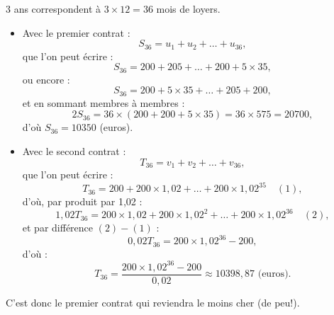 3 ans correspondent à \( 3 \times 12 = 36 \) mois de loyers.

\begin{itemize}
    \item Avec le premier contrat :
    \[
    S_{36} = u_1 + u_2 + \dots + u_{36},
    \]
    que l'on peut écrire :
    \[
    S_{36} = 200 + 205 + \dots + 200 + 5 \times 35,
    \]
    ou encore :
    \[
    S_{36} = 200 + 5 \times 35 + \dots + 205 + 200,
    \]
    et en sommant membres à membres :
    \[
    2S_{36} = 36 \times (200 + 200 + 5 \times 35) = 36 \times 575 = 20700,
    \]
   	d'où \(S_{36} = 10350\) (euros).

    \item Avec le second contrat :
    \[
    T_{36} = v_1 + v_2 + \dots + v_{36},
    \]
    que l'on peut écrire :
    \[
    T_{36} = 200 + 200 \times 1{,}02 + \dots + 200 \times 1{,}02^{35} \quad (1),
    \]
    d'où, par produit par 1{,}02 :
    \[
    1{,}02 T_{36} = 200 \times 1{,}02 + 200 \times 1{,}02^2 + \dots + 200 \times 1{,}02^{36} \quad (2),
    \]
    et par différence \((2) - (1)\) :
    \[
    0{,}02 T_{36} = 200 \times 1{,}02^{36} - 200,
    \]
    d'où :
    \[
    T_{36} = \dfrac{200 \times 1{,}02^{36} - 200}{0{,}02} \approx 10398{,}87 \text{ (euros)}.
    \]
\end{itemize}

C'est donc le premier contrat qui reviendra le moins cher (de peu!).
